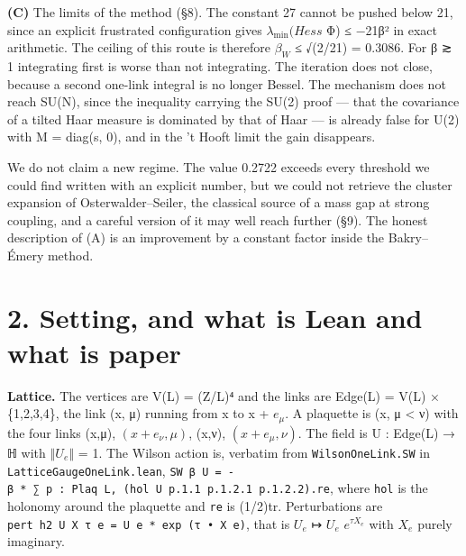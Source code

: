 \documentclass[11pt,a4paper]{article}
\theoremstyle{named}
\begin{document}
\textbf{(C)} The limits of the method (§8). The constant 27 cannot be pushed below 21, since an explicit frustrated configuration gives $λ_{\min}(Hess$ Φ) ≤ −21β² in exact arithmetic. The ceiling of this route is therefore $β_W$ ≤ √(2/21) = 0.3086. For β ≳ 1 integrating first is worse than not integrating. The iteration does not close, because a second one-link integral is no longer Bessel. The mechanism does not reach SU(N), since the inequality carrying the SU(2) proof — that the covariance of a tilted Haar measure is dominated by that of Haar — is already false for U(2) with M = diag(s, 0), and in the 't Hooft limit the gain disappears.

We do not claim a new regime. The value 0.2722 exceeds every threshold we could find written with an explicit number, but we could not retrieve the cluster expansion of Osterwalder–Seiler, the classical source of a mass gap at strong coupling, and a careful version of it may well reach further (§9). The honest description of (A) is an improvement by a constant factor inside the Bakry–Émery method.

\section*{2. Setting, and what is Lean and what is paper}
\textbf{Lattice.} The vertices are V(L) = (Z/L)⁴ and the links are Edge(L) = V(L) × \{1,2,3,4\}, the link (x, μ) running from x to x + $e_{μ}$. A plaquette is (x, μ \textless{} ν) with the four links (x,μ), $(x+e_{ν},μ)$, (x,ν), $(x+e_{μ},ν)$. The field is U : Edge(L) → ℍ with $‖U_e‖$ = 1. The Wilson action is, verbatim from \texttt{WilsonOneLink.\allowbreak{}SW} in \texttt{LatticeGaugeOneLink.\allowbreak{}lean}, \texttt{SW\ \allowbreak{}β\ \allowbreak{}U\ \allowbreak{}=\ \allowbreak{}-β\ \allowbreak{}*\ \allowbreak{}∑\ \allowbreak{}p\ \allowbreak{}:\ \allowbreak{}Plaq\ \allowbreak{}L,\ \allowbreak{}(hol\ \allowbreak{}U\ \allowbreak{}p.\allowbreak{}1.\allowbreak{}1\ \allowbreak{}p.\allowbreak{}1.\allowbreak{}2.\allowbreak{}1\ \allowbreak{}p.\allowbreak{}1.\allowbreak{}2.\allowbreak{}2).\allowbreak{}re}, where \texttt{hol} is the holonomy around the plaquette and \texttt{re} is (1/2)tr. Perturbations are \texttt{pert\ \allowbreak{}h2\ \allowbreak{}U\ \allowbreak{}X\ \allowbreak{}τ\ \allowbreak{}e\ \allowbreak{}=\ \allowbreak{}U\ \allowbreak{}e\ \allowbreak{}*\ \allowbreak{}exp\ \allowbreak{}(τ\ \allowbreak{}•\ \allowbreak{}X\ \allowbreak{}e)}, that is $U_e$ ↦ $U_e$ $e^{τX_e}$ with $X_e$ purely imaginary.
\end{document}
